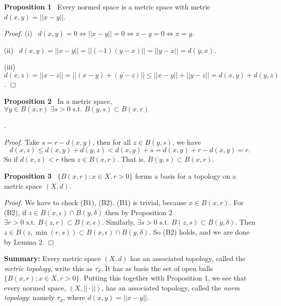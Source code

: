 \documentclass[12pt]{article}
\newcommand{\st}[0]{ \textrm{ s.t. } }
\newcommand{\lrimply}[0] { \Leftrightarrow }
\newcommand{\eps}[0] {  \epsilon }
\begin{document}
\begin{flushleft}
\begin{enumerate}
            \end{enumerate}\end{flushleft}\begin{flushleft}
 { \bf Proposition  1 } \ Every normed space is a metric space with metric
 $d(x,y) = ||x-y||$.\begin{flushleft}
 \emph{Proof.  }(i) \ $ d(x,y)=0 \lrimply ||x-y||=0 \lrimply x-y = 0 \lrimply x=y$.

 (ii) \ $d(x,y) = ||x-y|| = ||(-1)(y-x)|| = ||y-x|| = d(y,x)$.

 (iii) \ $d(x,z) = ||x-z|| = ||(x-y)+(y-z)|| \le ||x-y|| + ||y - z|| = d(x,y) + d(y,z)$. $\Box$ \end{flushleft}\end{flushleft}\begin{flushleft}
 { \bf Proposition  2 } \ In a metric space,
$\forall y \in B(x,r) \; \exists s > 0 \st B(y,s) \subset B(x,r)$\begin{flushleft}.

 \emph{Proof.  }Take $s = r - d(x,y)$, then for all $z \in B(y, s)$, we have
$$d(x,z) \le d(x,y) + d(y,z) < d(x,y) + s = d(x,y) + r - d(x,y) = r .$$
So if  $d(x,z) < r$ then $z \in B(x,r)$.  That is, $B(y,s) \subset B(x,r)$.
\end{flushleft}\end{flushleft}\begin{flushleft}
 { \bf Proposition 3 } \ $\{ B(x, r) :  x \in X, r>0 \}$ forms a basis for a topology on a metric space $(X, d)$.\begin{flushleft}
 \emph{Proof.  }We have to check (B1), (B2). (B1) is trivial, because $x \in B(x,r)$. For (B2),
 if $ z \in B(x,\eps) \cap B(y,\delta)$ then by Proposition 2
$\exists r>0 \st B(z,r) \subset B(x,\eps)$.  Similarly, $\exists s>0 \st B(z,s) \subset B(y,\delta)$. Then $z \in B(z, \min(r,s)) \subset B(x,\eps) \cap B(y,\delta)$.  So (B2) holds, and we are done by Lemma 2. $\Box$
\end{flushleft}\end{flushleft}\begin{flushleft}
{\bf  Summary:} Every metric space $(X, d)$ has an associated topology, called the \emph{metric topology}, write this as $\tau_d$. It has as basis the set of open balls $\{ B(x, r); x \in X, r>0 \}$. Putting this together with
Proposition 1, we see that every normed space, $(X, || \cdot ||)$,
has an associated topology, called the \emph{norm topology}: namely $\tau_d$,
where $d(x,y) = ||x-y||$.\end{flushleft}
\end{document}
